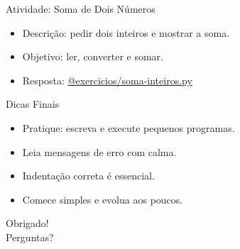 \documentclass[aspectratio=169]{beamer}
\begin{document}
\begin{frame}{Atividade: Soma de Dois Números}
  \begin{itemize}
    \item Descrição: pedir dois inteiros e mostrar a soma.
    \item Objetivo: ler, converter e somar.
    \item Resposta: \href{https://github.com/claudioscheer/exercicios-iniciantes-python/blob/master/exercicios/soma-inteiros.py}{@exercicios/soma-inteiros.py}
  \end{itemize}
\end{frame}

\begin{frame}{Dicas Finais}
  \begin{itemize}
    \item Pratique: escreva e execute pequenos programas.
    \item Leia mensagens de erro com calma.
    \item Indentação correta é essencial.
    \item Comece simples e evolua aos poucos.
  \end{itemize}
\end{frame}

\begin{frame}
  \centering
  \Large Obrigado! \\
  \vspace{0.5em}
  \normalsize Perguntas?
\end{frame}
\end{document}

